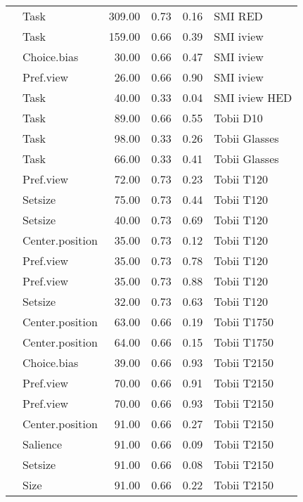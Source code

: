 \begin{longtable}{llrrrl}
  \cite{vanherpen2011} & Task & 309.00 & 0.73 & 0.16 & SMI RED \\ 
  \cite{keller2014} & Task & 159.00 & 0.66 & 0.39 & SMI iview \\ 
  \cite{lindner2014} & Choice.bias & 30.00 & 0.66 & 0.47 & SMI iview \\ 
  \cite{lindner2014} & Pref.view & 26.00 & 0.66 & 0.90 & SMI iview \\ 
  \cite{gidlof2013} & Task & 40.00 & 0.33 & 0.04 & SMI iview HED \\ 
  \cite{turner2014} & Task & 89.00 & 0.66 & 0.55 & Tobii D10 \\ 
  \cite{wastlund2015} & Task & 98.00 & 0.33 & 0.26 & Tobii Glasses \\ 
  \cite{wastlund2015} & Task & 66.00 & 0.33 & 0.41 & Tobii Glasses \\ 
  \cite{du2014} & Pref.view & 72.00 & 0.73 & 0.23 & Tobii T120 \\ 
  \cite{hong2016a} & Setsize & 75.00 & 0.73 & 0.44 & Tobii T120 \\ 
  \cite{meissner2016b} & Setsize & 40.00 & 0.73 & 0.69 & Tobii T120 \\ 
  \cite{meissner2016a} & Center.position & 35.00 & 0.73 & 0.12 & Tobii T120 \\ 
  \cite{meissner2016a} & Pref.view & 35.00 & 0.73 & 0.78 & Tobii T120 \\ 
  \cite{meissner2016a} & Pref.view & 35.00 & 0.73 & 0.88 & Tobii T120 \\ 
  \cite{spinks2016a} & Setsize & 32.00 & 0.73 & 0.63 & Tobii T120 \\ 
  \cite{atalay2012a} & Center.position & 63.00 & 0.66 & 0.19 & Tobii T1750 \\ 
  \cite{atalay2012a} & Center.position & 64.00 & 0.66 & 0.15 & Tobii T1750 \\ 
  \cite{krajbich2010a} & Choice.bias & 39.00 & 0.66 & 0.93 & Tobii T2150 \\ 
  \cite{meissner2016a} & Pref.view & 70.00 & 0.66 & 0.91 & Tobii T2150 \\ 
  \cite{meissner2016a} & Pref.view & 70.00 & 0.66 & 0.93 & Tobii T2150 \\ 
  \cite{orquin2019a} & Center.position & 91.00 & 0.66 & 0.27 & Tobii T2150 \\ 
  \cite{orquin2019a} & Salience & 91.00 & 0.66 & 0.09 & Tobii T2150 \\ 
  \cite{orquin2019a} & Setsize & 91.00 & 0.66 & 0.08 & Tobii T2150 \\ 
  \cite{orquin2019a} & Size & 91.00 & 0.66 & 0.22 & Tobii T2150 \\ 

\end{longtable}
